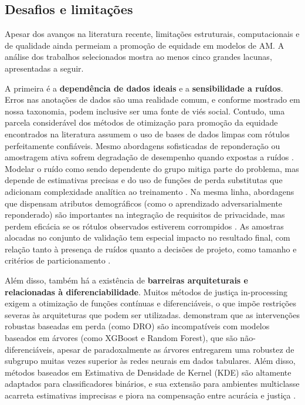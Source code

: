 \subsection{Desafios e limitações}\label{sec:desafios_otim}

Apesar dos avanços na literatura recente, limitações estruturais, computacionais e de qualidade ainda permeiam a promoção de equidade em modelos de AM. A análise dos trabalhos selecionados mostra ao menos cinco grandes lacunas, apresentadas a seguir.

A primeira é a \textbf{dependência de dados ideais} e a  \textbf{sensibilidade a ruídos}. Erros nas anotações de dados são uma realidade comum, e conforme mostrado em nossa taxonomia, podem inclusive ser uma fonte de viés social. Contudo, uma parcela considerável dos métodos de otimização para promoção da equidade encontrados na literatura assumem o uso de bases de dados limpas com rótulos perfeitamente confiáveis. Mesmo abordagens sofisticadas de reponderação ou amostragem ativa sofrem degradação de desempenho quando expostas a ruídos \cite{pang2024fairness}. Modelar o ruído como sendo dependente do grupo mitiga parte do problema, mas depende de estimativas precisas e do uso de funções de perda substitutas que adicionam complexidade analítica ao treinamento \cite{wang2021fair}. Na mesma linha, abordagens que dispensam atributos demográficos (como o aprendizado adversarialmente reponderado) são importantes na integração de requisitos de privacidade, mas perdem eficácia se os rótulos observados estiverem corrompidos \cite{lahoti2020fairness}. As amostras alocadas no conjunto de validação tem especial impacto no resultado final, com relação tanto à presença de ruídos quanto a decisões de projeto, como tamanho e critérios de particionamento \cite{abernethy2020active}.

Além disso, também há a existência de \textbf{barreiras arquiteturais e relacionadas à diferenciabilidade}. Muitos métodos de justiça in-processing exigem a otimização de funções contínuas e diferenciáveis, o que impõe restrições severas às arquiteturas que podem ser utilizadas. \citet{gardner2022subgroup} demonstram que as intervenções robustas baseadas em perda (como DRO) são incompatíveis com modelos baseados em árvores (como XGBoost e Random Forest), que são não-diferenciáveis, apesar de paradoxalmente as árvores entregarem uma robustez de subgrupo muitas vezes superior às redes neurais em dados tabulares. Além disso, métodos baseados em Estimativa de Densidade de Kernel (KDE) são altamente adaptados para classificadores binários, e sua extensão para ambientes multiclasse acarreta estimativas imprecisas e piora na compensação entre acurácia e justiça \cite{cho2020fair}.

